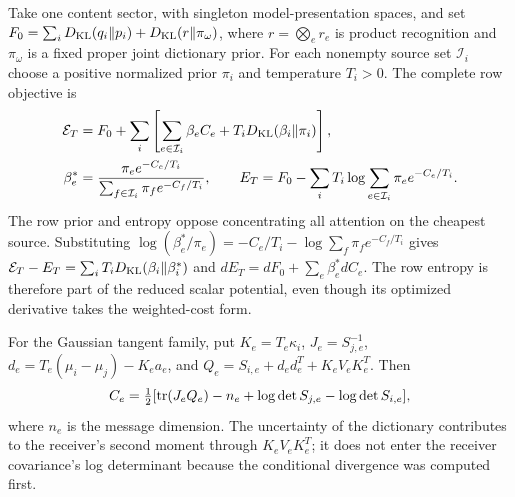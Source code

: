 Take one content sector, with singleton model-presentation spaces, and set $F_0=\sum_iD_{\mathrm{KL}}(q_i\Vert p_i)+D_{\mathrm{KL}}(r\Vert\pi_\omega)$, where $r=\bigotimes_e r_e$ is product recognition and $\pi_\omega$ is a fixed proper joint dictionary prior. For each nonempty source set $\mathcal I_i$ choose a positive normalized prior $\pi_i$ and temperature $T_i>0$. The complete row objective is
\begin{equation}
 \begin{aligned}
 \mathcal E_T&=F_0+\sum_i\left[\sum_{e\in\mathcal I_i}\beta_eC_e
                         +T_iD_{\mathrm{KL}}(\beta_i\Vert\pi_i)\right],\\
 \beta_e^*&=\frac{\pi_e e^{-C_e/T_i}}{\sum_{f\in\mathcal I_i}\pi_f e^{-C_f/T_i}},
 \qquad
 E_T=F_0-\sum_iT_i\log\sum_{e\in\mathcal I_i}\pi_e e^{-C_e/T_i}.
 \end{aligned}
 \label{c18:coupled-objectives}
\end{equation}
The row prior and entropy oppose concentrating all attention on the cheapest source. Substituting $\log(\beta_e^*/\pi_e)=-C_e/T_i-\log\sum_f\pi_fe^{-C_f/T_i}$ gives $\mathcal E_T-E_T=\sum_iT_iD_{\mathrm{KL}}(\beta_i\Vert\beta_i^*)$ and $dE_T=dF_0+\sum_e\beta_e^*dC_e$. The row entropy is therefore part of the reduced scalar potential, even though its optimized derivative takes the weighted-cost form.

For the Gaussian tangent family, put $K_e=T_e\kappa_i$, $J_e=S_{j,e}^{-1}$, $d_e=T_e(\mu_i-\mu_j)-K_ea_e$, and $Q_e=S_{i,e}+d_ed_e^T+K_eV_eK_e^T$. Then
\begin{equation}
 C_e=\tfrac12[\operatorname{tr}(J_eQ_e)-n_e+\log\det S_{j,e}-\log\det S_{i,e}],
 \label{c18:coupled-cost}
\end{equation}
where $n_e$ is the message dimension. The uncertainty of the dictionary contributes to the receiver's second moment through $K_eV_eK_e^T$; it does not enter the receiver covariance's log determinant because the conditional divergence was computed first.

